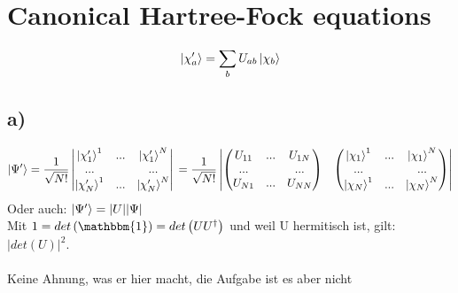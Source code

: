 \section{Canonical Hartree-Fock equations}

\begin{equation}
\Ket{\chi_a'} = \sum_b U_{ab} \Ket{\chi_b}
\end{equation}

\subsection{a)}

\begin{equation}
\Ket{\Psi'} = \frac{1}{\sqrt{N!}} 
\begin{vmatrix}
\Ket{\chi_1'}^1 & ... & \Ket{\chi_1'}^N \\
... &  & ... \\
\Ket{\chi_N'}^1 & ... & \Ket{\chi_N'}^N
\end{vmatrix} \\
= \frac{1}{\sqrt{N!}}
\begin{vmatrix}
\begin{pmatrix}
U_{11} & ... & U_{1N} \\
... &  & ... \\
U_{N1} & ... & U_{NN}
\end{pmatrix}
&
\begin{pmatrix}
\Ket{\chi_1}^1 & ... & \Ket{\chi_1}^N \\
... &  & ... \\
\Ket{\chi_N}^1 & ... & \Ket{\chi_N}^N
\end{pmatrix}
\end{vmatrix}
\end{equation}
Oder auch: $\Ket{\Psi '} = |U|  |\Psi|$\\
Mit $1 = det \left( \mathbbm{1} \right) = det \left(U U^{\dagger} \right)$ und weil U hermitisch ist, gilt:\\
$|det \left( U \right) |^2$.\\
\\
Keine Ahnung, was er hier macht, die Aufgabe ist es aber nicht